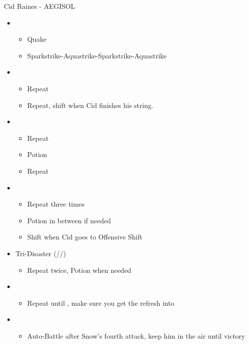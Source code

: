	\begin{battle}[1:20]{Cid Raines - AEGISOL}
	\begin{itemize}
	\renewcommand{\fourth}{[4] Tri-Disaster (\rav/\rav/\rav)}
			\item \first
			      \begin{itemize}
				      \item Quake
				      \item Sparkstrike-Aquastrike-Sparkstrike-Aquastrike
			      \end{itemize}
			\item \third
			      \begin{itemize}
				      \item Repeat
				      \item Repeat, shift when Cid finishes his string.
			      \end{itemize}
			\item \fifth
			      \begin{itemize}
				      \item Repeat
				      \item Potion
				      \item Repeat
			      \end{itemize}
			\item \second
			      \begin{itemize}
				      \item Repeat three times
				      \item Potion in between if needed
				      \item Shift when Cid goes to Offensive Shift
			      \end{itemize}
			\item \fourth
			      \begin{itemize}
				      \item Repeat twice, Potion when needed
			      \end{itemize}
			\item \second
				\begin{itemize}
					\item Repeat until \stagger, make sure you get the refresh into
				\end{itemize}
			\item \sixth
			      \begin{itemize}
				      \item Auto-Battle after Snow's fourth attack, keep him in the air until victory
			      \end{itemize}
		\end{itemize}
		\end{battle}
